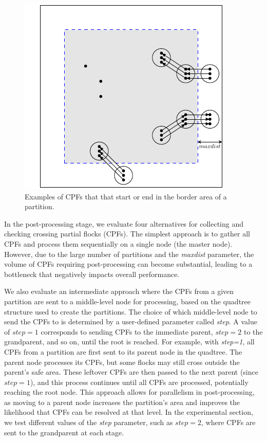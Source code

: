 \begin{figure}
    \centering
    \includegraphics[width=0.7\linewidth]{pflocks_paper/figures/maxdist.pdf}
    \caption{Examples of CPFs that that start or end in the border area of a partition.}\label{fig:maxdist}
\end{figure}



In the post-processing stage, we evaluate four alternatives for collecting and checking crossing partial flocks (CPFs). The simplest approach is to gather all CPFs and process them sequentially on a single node (the master node). However, due to the large number of partitions and the \textit{maxdist} parameter, the volume of CPFs requiring post-processing can become substantial, leading to a bottleneck that negatively impacts overall performance.

We also evaluate an intermediate approach where the CPFs from a given partition are sent to a middle-level node for processing, based on the quadtree structure used to create the partitions. The choice of which middle-level node to send the CPFs to is determined by a user-defined parameter called \textit{step}. A value of $step = 1$ corresponds to sending CPFs to the immediate parent, $step = 2$ to the grandparent, and so on, until the root is reached. For example, with \textit{step=1}, all CPFs from a partition are first sent to its parent node in the quadtree. The parent node processes its CPFs, but some flocks may still cross outside the parent's safe area.  These leftover CPFs are then passed to the next parent (since $step = 1$), and this process continues until all CPFs are processed, potentially reaching the root node. This approach allows for parallelism in post-processing, as moving to a parent node increases the partition's area and improves the likelihood that CPFs can be resolved at that level. In the experimental section, we test different values of the \textit{step} parameter, such as $step=2$, where CPFs are sent to the grandparent at each stage.

